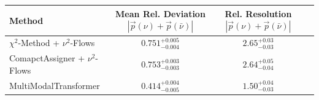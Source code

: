     \begin{tabular}{lccc}
        \toprule
        Method & Mean Rel. Deviation $|\vec{p}(\nu) + \vec{p}(\bar{\nu})|$ & Rel. Resolution $|\vec{p}(\nu) + \vec{p}(\bar{\nu})|$ \\
        \midrule
        $\chi^2$-Method + $\nu^2$-Flows & $0.751^{+0.005}_{-0.004}$ & $2.65^{+0.03}_{-0.03}$ \\
        ComapctAssigner + $\nu^2$-Flows & $0.753^{+0.003}_{-0.003}$ & $2.64^{+0.05}_{-0.04}$ \\
        MultiModalTransformer & $0.414^{+0.004}_{-0.005}$ & $1.50^{+0.04}_{-0.03}$ \\
        \bottomrule
    \end{tabular}